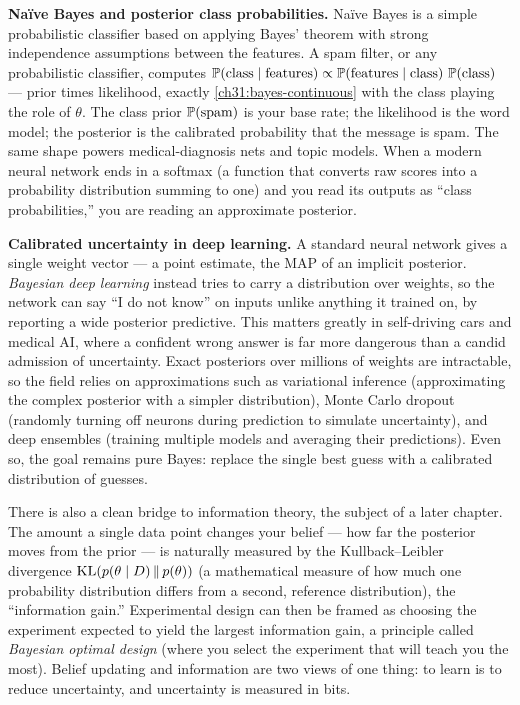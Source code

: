 \begin{applicationbox}
\textbf{Na\"ive Bayes and posterior class probabilities.} Na\"ive Bayes is a simple probabilistic classifier based on applying Bayes' theorem with strong independence assumptions between the features. A spam filter, or any
probabilistic classifier, computes $\P(\text{class}\given\text{features}) \propto
\P(\text{features}\given\text{class})\,\P(\text{class})$ --- prior times likelihood,
exactly \eqref{ch31:bayes-continuous} with the class playing the role of $\theta$. The
class prior $\P(\text{spam})$ is your base rate; the likelihood is the word model; the
posterior is the calibrated probability that the message is spam. The same shape powers
medical-diagnosis nets and topic models. When a modern neural network ends in a softmax (a function that converts raw scores into a probability distribution summing to one) and
you read its outputs as ``class probabilities,'' you are reading an approximate posterior.
\end{applicationbox}

\begin{applicationbox}
\textbf{Calibrated uncertainty in deep learning.} A standard neural network gives a single
weight vector --- a point estimate, the MAP of an implicit posterior. \emph{Bayesian deep
learning} instead tries to carry a distribution over weights, so the network can say ``I do
not know'' on inputs unlike anything it trained on, by reporting a wide posterior
predictive. This matters greatly in self-driving cars and medical AI, where a confident
wrong answer is far more dangerous than a candid admission of uncertainty. Exact posteriors
over millions of weights are intractable, so the field relies on approximations such as
variational inference (approximating the complex posterior with a simpler distribution), Monte Carlo dropout (randomly turning off neurons during prediction to simulate uncertainty), and deep ensembles (training multiple models and averaging their predictions). Even so, the goal remains
pure Bayes: replace the single best guess with a calibrated distribution of guesses.
\end{applicationbox}

\begin{connectionbox}
There is also a clean bridge to information theory, the subject of a later chapter. The
amount a single data point changes your belief --- how far the posterior moves from the
prior --- is naturally measured by the Kullback--Leibler divergence $\KL(p(\theta\given
D)\,\|\,p(\theta))$ (a mathematical measure of how much one probability distribution differs from a second, reference distribution), the ``information gain.'' Experimental design can then be framed as
choosing the experiment expected to yield the largest information gain, a principle called
\emph{Bayesian optimal design} (where you select the experiment that will teach you the most). Belief updating and information are two views of one thing:
to learn is to reduce uncertainty, and uncertainty is measured in bits.
\end{connectionbox}


